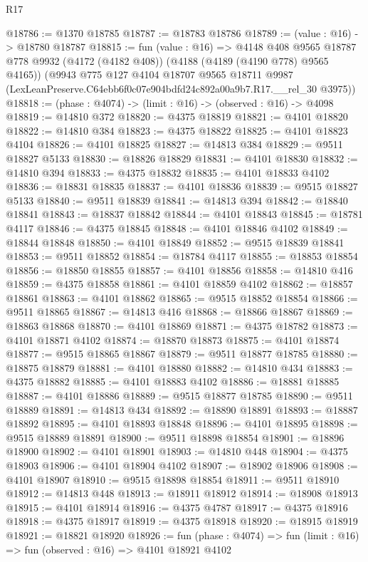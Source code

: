 \begin{lexlean}{R17}
\begin{coremodule}
@18786 := @1370 @18785
@18787 := @18783 @18786
@18789 := (value : @16) -> @18780 @18787
@18815 := fun (value : @16) =>
  @4148
    @408
    @9565
    @18787
    @778
    @9932
    (@4172 (@4182 @408))
    (@4188 (@4189 (@4190 @778) @9565 @4165))
    (@9943
      @775
      @127
      @4104
      @18707
      @9565
      @18711
      @9987
      (LexLeanPreserve.C64ebb6f0c07e904bdfd24c892a00a9b7.R17.__rel_30 @3975))
@18818 := (phase : @4074) -> (limit : @16) -> (observed : @16) -> @4098
@18819 := @14810 @372
@18820 := @4375 @18819
@18821 := @4101 @18820
@18822 := @14810 @384
@18823 := @4375 @18822
@18825 := @4101 @18823 @4104
@18826 := @4101 @18825
@18827 := @14813 @384
@18829 := @9511 @18827 @5133
@18830 := @18826 @18829
@18831 := @4101 @18830
@18832 := @14810 @394
@18833 := @4375 @18832
@18835 := @4101 @18833 @4102
@18836 := @18831 @18835
@18837 := @4101 @18836
@18839 := @9515 @18827 @5133
@18840 := @9511 @18839
@18841 := @14813 @394
@18842 := @18840 @18841
@18843 := @18837 @18842
@18844 := @4101 @18843
@18845 := @18781 @4117
@18846 := @4375 @18845
@18848 := @4101 @18846 @4102
@18849 := @18844 @18848
@18850 := @4101 @18849
@18852 := @9515 @18839 @18841
@18853 := @9511 @18852
@18854 := @18784 @4117
@18855 := @18853 @18854
@18856 := @18850 @18855
@18857 := @4101 @18856
@18858 := @14810 @416
@18859 := @4375 @18858
@18861 := @4101 @18859 @4102
@18862 := @18857 @18861
@18863 := @4101 @18862
@18865 := @9515 @18852 @18854
@18866 := @9511 @18865
@18867 := @14813 @416
@18868 := @18866 @18867
@18869 := @18863 @18868
@18870 := @4101 @18869
@18871 := @4375 @18782
@18873 := @4101 @18871 @4102
@18874 := @18870 @18873
@18875 := @4101 @18874
@18877 := @9515 @18865 @18867
@18879 := @9511 @18877 @18785
@18880 := @18875 @18879
@18881 := @4101 @18880
@18882 := @14810 @434
@18883 := @4375 @18882
@18885 := @4101 @18883 @4102
@18886 := @18881 @18885
@18887 := @4101 @18886
@18889 := @9515 @18877 @18785
@18890 := @9511 @18889
@18891 := @14813 @434
@18892 := @18890 @18891
@18893 := @18887 @18892
@18895 := @4101 @18893 @18848
@18896 := @4101 @18895
@18898 := @9515 @18889 @18891
@18900 := @9511 @18898 @18854
@18901 := @18896 @18900
@18902 := @4101 @18901
@18903 := @14810 @448
@18904 := @4375 @18903
@18906 := @4101 @18904 @4102
@18907 := @18902 @18906
@18908 := @4101 @18907
@18910 := @9515 @18898 @18854
@18911 := @9511 @18910
@18912 := @14813 @448
@18913 := @18911 @18912
@18914 := @18908 @18913
@18915 := @4101 @18914
@18916 := @4375 @4787
@18917 := @4375 @18916
@18918 := @4375 @18917
@18919 := @4375 @18918
@18920 := @18915 @18919
@18921 := @18821 @18920
@18926 := fun (phase : @4074) => fun (limit : @16) => fun (observed : @16) => @4101 @18921 @4102

\end{coremodule}
\end{lexlean}

